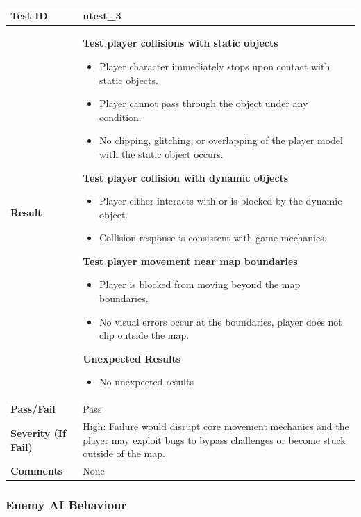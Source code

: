 \documentclass[11pt, a4paper]{article}
\begin{document}
\begin{center}
\begin{tabularx}{\linewidth}{|>{\raggedright\arraybackslash}m{4cm}|X|}
    \hline
    \textbf{Test ID} & utest\_3 \\
    \hline
    \textbf{Result} &
    \textbf{Test player collisions with static objects}
    \begin{itemize}
        \item Player character immediately stops upon contact with static objects.
        \item Player cannot pass through the object under any condition.
        \item No clipping, glitching, or overlapping of the player model with the static object occurs.
    \end{itemize}
    \textbf{Test player collision with dynamic objects}
    \begin{itemize}
        \item Player either interacts with or is blocked by the dynamic object.
        \item Collision response is consistent with game mechanics.
    \end{itemize}
    \textbf{Test player movement near map boundaries}
    \begin{itemize}
        \item Player is blocked from moving beyond the map boundaries.
        \item No visual errors occur at the boundaries, player does not clip outside the map.
    \end{itemize}
    \textbf{Unexpected Results}
    \begin{itemize}
        \item No unexpected results
    \end{itemize}
    \\
    \hline
    \textbf{Pass/Fail} & Pass \\
    \hline
    \textbf{Severity (If Fail)} & High: Failure would disrupt core movement mechanics and the player may exploit bugs to bypass challenges or become stuck outside of the map. \\
    \hline
    \textbf{Comments} & None \\
    \hline
\end{tabularx}
\end{center}

\subsubsection{Enemy AI Behaviour}
\end{document}
